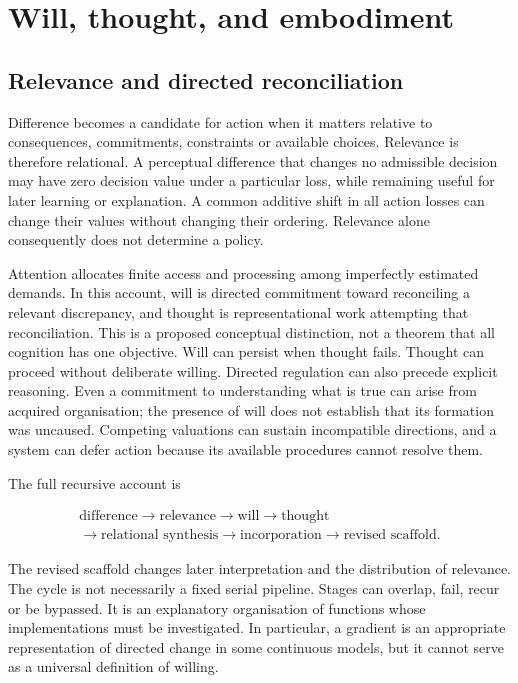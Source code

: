 \documentclass[
  11pt,
  a4paper,
]{article}
\begin{document}
\section{Will, thought, and
embodiment}\label{will-thought-and-embodiment}

\subsection{Relevance and directed
reconciliation}\label{relevance-and-directed-reconciliation}

Difference becomes a candidate for action when it matters relative to
consequences, commitments, constraints or available choices. Relevance
is therefore relational. A perceptual difference that changes no
admissible decision may have zero decision value under a particular
loss, while remaining useful for later learning or explanation. A common
additive shift in all action losses can change their values without
changing their ordering. Relevance alone consequently does not determine
a policy.

Attention allocates finite access and processing among imperfectly
estimated demands. In this account, will is directed commitment toward
reconciling a relevant discrepancy, and thought is representational work
attempting that reconciliation. This is a proposed conceptual
distinction, not a theorem that all cognition has one objective. Will
can persist when thought fails. Thought can proceed without deliberate
willing. Directed regulation can also precede explicit reasoning. Even a
commitment to understanding what is true can arise from acquired
organisation; the presence of will does not establish that its formation
was uncaused. Competing valuations can sustain incompatible directions,
and a system can defer action because its available procedures cannot
resolve them.

The full recursive account is

\[
\begin{gathered}
\text{difference}\to\text{relevance}\to\text{will}\to\text{thought}\\
\to\text{relational synthesis}\to\text{incorporation}\to\text{revised scaffold}.
\end{gathered}
\]

The revised scaffold changes later interpretation and the distribution
of relevance. The cycle is not necessarily a fixed serial pipeline.
Stages can overlap, fail, recur or be bypassed. It is an explanatory
organisation of functions whose implementations must be investigated. In
particular, a gradient is an appropriate representation of directed
change in some continuous models, but it cannot serve as a universal
definition of willing.
\end{document}
